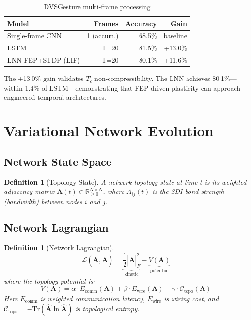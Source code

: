 \documentclass[12pt]{article}
\newtheorem{definition}[theorem]{Definition}
\begin{document}
\begin{table}[h]
\centering
\begin{tabular}{lrrr}
\toprule
Model & Frames & Accuracy & Gain \\
\midrule
Single-frame CNN & 1 (accum.) & 68.5\% & baseline \\
LSTM & T=20 & 81.5\% & +13.0\% \\
LNN FEP+STDP (LIF) & T=20 & 80.1\% & +11.6\% \\
\bottomrule
\end{tabular}
\caption{DVSGesture multi-frame processing}
\end{table}

The +13.0\% gain validates $T_c$ non-compressibility. The LNN
achieves 80.1\%---within 1.4\% of LSTM---demonstrating that FEP-driven
plasticity can approach engineered temporal architectures.

\section{Variational Network Evolution}

\subsection{Network State Space}

\begin{definition}[Topology State]
A network topology state at time $t$ is its weighted adjacency matrix
$\mathbf{A}(t) \in \mathbb{R}^{N \times N}_{\geq 0}$, where
$A_{ij}(t)$ is the SDI-bond strength (bandwidth) between nodes
$i$ and $j$.
\end{definition}

\subsection{Network Lagrangian}

\begin{definition}[Network Lagrangian]
\begin{equation}
\mathcal{L}(\mathbf{A}, \dot{\mathbf{A}}) =
\underbrace{\frac{1}{2}|\dot{\mathbf{A}}|_F^2}_{\text{kinetic}} -
\underbrace{V(\mathbf{A})}_{\text{potential}}
\end{equation}
where the topology potential is:
\begin{equation}
V(\mathbf{A}) = \alpha \cdot E_{\text{comm}}(\mathbf{A}) +
\beta \cdot E_{\text{wire}}(\mathbf{A}) -
\gamma \cdot \mathcal{C}_{\text{topo}}(\mathbf{A})
\end{equation}
Here $E_{\text{comm}}$ is weighted communication latency,
$E_{\text{wire}}$ is wiring cost, and $\mathcal{C}_{\text{topo}} =
-\text{Tr}(\hat{\mathbf{A}} \ln \hat{\mathbf{A}})$ is topological
entropy.
\end{definition}
\end{document}
